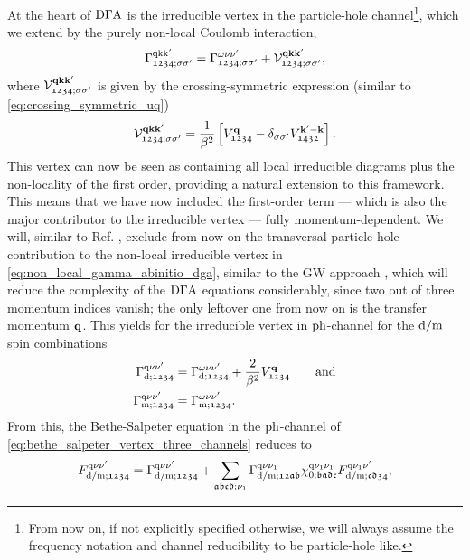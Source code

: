 \documentclass[../../main.tex]{subfiles}
\begin{document}
At the heart of $\text{D}\Gamma\text{A}$ is the irreducible vertex in the particle-hole channel\footnote{From now on, if not explicitly specified otherwise, we will always assume the frequency notation and channel reducibility to be particle-hole like.}, which we extend by the purely non-local Coulomb interaction,
\begin{align}\label{eq:non_local_gamma_abinitio_dga}
	\Gamma^{\text{q}\text{k}\text{k}'}_{\mathfrak{1234};\sigma\sigma'}=\Gamma^{\omega\nu\nu'}_{\mathfrak{1234};\sigma\sigma'}+\mathcal{V}^{\textbf{qkk}'}_{\mathfrak{1234};\sigma\sigma'},
\end{align}
where $\mathcal{V}^{\textbf{qkk}'}_{\mathfrak{1234};\sigma\sigma'}$ is given by the crossing-symmetric expression (similar to \eqref{eq:crossing_symmetric_uq})
\begin{align}
	\mathcal{V}^{\textbf{qkk}'}_{\mathfrak{1234};\sigma\sigma'}=\frac{1}{\beta^2}\left [V^{\textbf{q}}_{\mathfrak{1234}}-\delta_{\sigma\sigma'}V^{\textbf{k}'-\textbf{k}}_{\mathfrak{1432}}\right ].
\end{align}
This vertex can now be seen as containing all local irreducible diagrams plus the non-locality of the first order, providing a natural extension to this framework. This means that we have now included the first-order term --- which is also the major contributor to the irreducible vertex --- fully momentum-dependent. We will, similar to Ref. \cite{ab initio dga}, exclude from now on the transversal particle-hole contribution to the non-local irreducible vertex in \eqref{eq:non_local_gamma_abinitio_dga}, similar to the GW approach \cite{GW tomczak}, which will reduce the complexity of the $\text{D}\Gamma\text{A}$ equations considerably, since two out of three momentum indices vanish; the only leftover one from now on is the transfer momentum $\textbf{q}$. This yields for the irreducible vertex in $\text{ph}$-channel for the $\text{d}/\text{m}$ spin combinations
\begin{subequations}\label{eq:gamma_dens_magn_dga}
\begin{align}
	\Gamma^{\text{q}\nu\nu'}_{\text{d};\mathfrak{1234}}&=\Gamma^{\omega\nu\nu'}_{\text{d};\mathfrak{1234}}+\frac{2}{\beta^2} V^{\textbf{q}}_{\mathfrak{1234}}\qquad\text{and}\\
	\Gamma^{\text{q}\nu\nu'}_{\text{m};\mathfrak{1234}}&=\Gamma^{\omega\nu\nu'}_{\text{m};\mathfrak{1234}}.\label{eq:gamma_magn_dga}
\end{align}
\end{subequations}
From this, the Bethe-Salpeter equation in the $\text{ph}$-channel of \eqref{eq:bethe_salpeter_vertex_three_channels} reduces to
\begin{align}
	F_{\text{d}/\text{m};\mathfrak{1234}}^{\text{q}\nu\nu'}=\Gamma^{\text{q}\nu\nu'}_{\text{d}/\text{m};\mathfrak{1234}}+\sum_{\mathfrak{abcd};\nu_1}\Gamma^{\text{q}\nu\nu_1}_{\text{d}/\text{m};\mathfrak{12ab}}\chi_{0;\mathfrak{badc}}^{\text{q}\nu_1\nu_1} F_{\text{d}/\text{m};\mathfrak{cd34}}^{\text{q}\nu_1\nu'},
\end{align}
\end{document}
